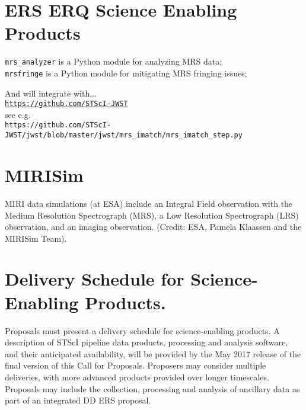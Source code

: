 \section*{ERS ERQ Science Enabling Products}
{\tt mrs\_analyzer} is  a Python module for analyzing MRS data; \\
{\tt mrsfringe} is a Python module for mitigating MRS fringing issues; \

\smallskip \smallskip
\noindent
And will integrate with...\\
\href{https://github.com/STScI-JWST}{\tt https://github.com/STScI-JWST} \\
see e.g. \\
{\tt https://github.com/STScI-JWST/jwst/blob/master/jwst/mrs\_imatch/mrs\_imatch\_step.py}\\


\section*{MIRISim}
MIRI data simulations (at ESA) include an Integral Field observation
with the Medium Resolution Spectrograph (MRS), a Low Resolution
Spectrograph (LRS) observation, and an imaging observation. (Credit:
ESA, Pamela Klaassen and the MIRISim Team).

\iffalse
\section{Useful links}
http://astroconda.readthedocs.io/en/latest/ \\
https://www.cosmos.esa.int/web/jwst/simulations\\
https://confluence.stsci.edu/display/JWSTDADF/JWST+Data+Analysis+Development+Forum\\
https://jwst.stsci.edu/science-planning/data-analysis-toolbox\\
https://www.youtube.com/watch?v=A024z9CITZs\\
https://jwst.stsci.edu/science-planning/proposal-planning-toolbox/simulated-data\\
\fi


\section*{Delivery Schedule for Science-Enabling Products.} 
Proposals must present a delivery schedule for science-enabling products. A description of STScI pipeline data products, processing and analysis software, and their anticipated availability, will be provided by the May 2017 release of the final version of this Call for Proposals.  Proposers may consider multiple deliveries, with more advanced products provided over longer timescales. Proposals may include the collection, processing and analysis of ancillary data as part of an integrated DD ERS proposal.


